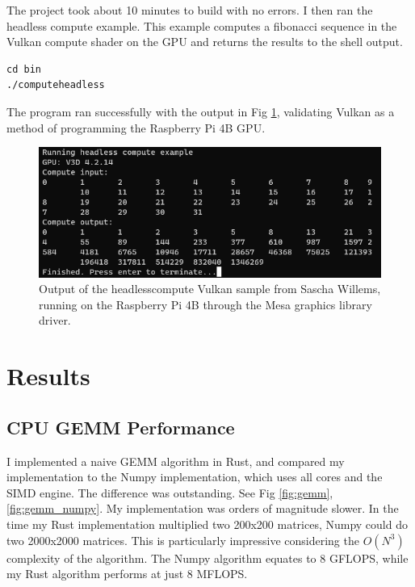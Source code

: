 \documentclass[12pt]{article}
\begin{document}
The project took about 10 minutes to build with no errors. I then ran the headless compute example. This example computes a fibonacci sequence in the Vulkan compute shader on the GPU and returns the results to the shell output.

\begin{lstlisting}
cd bin
./computeheadless
\end{lstlisting}

The program ran successfully with the output in Fig \ref{fig:computeheadless}, validating Vulkan as a method of programming the Raspberry Pi 4B GPU. 

\begin{figure}[h]
\centering
\includegraphics[width=1.0\textwidth]{Headless_Compute.png} %
\caption{Output of the headlesscompute Vulkan sample from Sascha Willems, running on the Raspberry Pi 4B through the Mesa graphics library driver.}
\label{fig:computeheadless}
\end{figure}

\section{Results}\label{sec:results}

\subsection{CPU GEMM Performance}
I implemented a naive GEMM algorithm in Rust, and compared my implementation to the Numpy implementation, which uses all cores and the SIMD engine. The difference was outstanding. See Fig \ref{fig:gemm}, \ref{fig:gemm_numpy}. My implementation was orders of magnitude slower. In the time my Rust implementation multiplied two 200x200 matrices, Numpy could do two 2000x2000 matrices. This is particularly impressive considering the $O(N^3)$ complexity of the algorithm. The Numpy algorithm equates to 8 GFLOPS, while my Rust algorithm performs at just 8 MFLOPS. 
\end{document}
